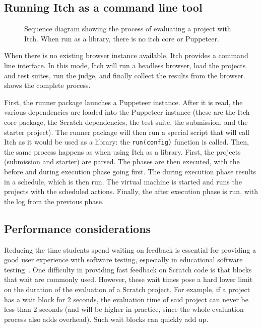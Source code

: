 \documentclass[../main]{subfiles}
\begin{document}
\subsection{Running Itch as a command line tool}\label{subsec:running-itch-as-a-command-line-tool}

\begin{figure}
    \begin{wide}
        
    \end{wide}
    \caption{Sequence diagram showing the process of evaluating a project with Itch. When run as a library, there is no itch core or Puppeteer.}
    \label{fig:itch-sequence-diagram}
\end{figure}

When there is no existing browser instance  available, Itch provides a command line interface.
In this mode, Itch will run a headless browser, load the projects and test suites, run the judge, and finally collect the results from the browser.
 shows the complete process.

First, the runner package launches a Puppeteer instance.
After it is read, the various dependencies are loaded into the Puppeteer instance (these are the Itch core package, the Scratch dependencies, the test suite, the submission, and the starter project).
The runner package will then run a special script that will call Itch as it would be used as a library: the \texttt{run(config)} function is called.
Then, the same process happens as when using Itch as a library.
First, the projects (submission and starter) are parsed.
The phases are then executed, with the before and during execution phase going first.
The during execution phase results in a schedule, which is then run.
The virtual machine is started and runs the projects with the scheduled actions.
Finally, the after execution phase is run, with the log from the previous phase.

\subsection{Performance considerations}\label{subsec:performance-considerations}

Reducing the time students spend waiting on feedback is essential for providing a good user experience with software testing, especially in educational software testing~\autocite{sarsaSpeedingAutomatedAssessment2022}.
One difficulty in providing fast feedback on Scratch code is that blocks that wait are commonly used.
However, these wait times pose a hard lower limit on the duration of the evaluation of a Scratch project.
For example, if a project has a wait block for 2 seconds, the evaluation time of said project can never be less than 2 seconds (and will be higher in practice, since the whole evaluation process also adds overhead).
Such wait blocks can quickly add up.
\end{document}
